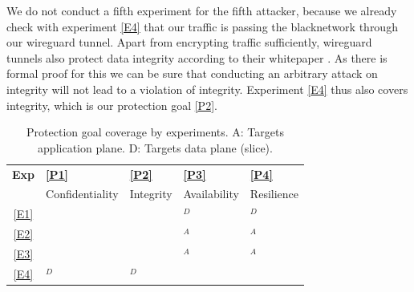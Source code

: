 \begin{description}[style=multiline, labelwidth=0.7cm]



\end{description}

We do not conduct a fifth experiment for the fifth attacker, because we already check with experiment \ref{E4} that our traffic is passing the \gls{blacknetwork} through our \gls{wireguard} tunnel. Apart from encrypting traffic sufficiently, \gls{wireguard} tunnels also protect data integrity according to their whitepaper \cite{wireguard}. As there is formal proof for this we can be sure that conducting an arbitrary attack on integrity will not lead to a violation of integrity. Experiment \ref{E4} thus also covers integrity, which is our protection goal \ref{P2}.

\begin{table}[ht]
    \centering
    \begin{tabular}{|c|P|P|P|P|}
        \hline
        \textbf{Exp} & \textbf{\ref{P1}} & \textbf{\ref{P2}} & \textbf{\ref{P3}} & \textbf{\ref{P4}} \\
        ~            & Confidentiality   & Integrity         & Availability      & Resilience        \\
        \hline
        \ref{E1}     & ~                 & ~                 & $^D$     & $^D$     \\
        \ref{E2}     & ~                 & ~                 & $^A$     & $^A$     \\
        \ref{E3}     & ~                 & ~                 & $^A$     & $^A$     \\
        \ref{E4}     & $^D$     & $^D$     & ~                 & ~                 \\
        \hline
    \end{tabular}
    \caption[Protection goal coverage by experiments]{Protection goal coverage by experiments. A: Targets application plane. D: Targets data plane (slice).}
    \label{table:experiment_coverage}
\end{table}

